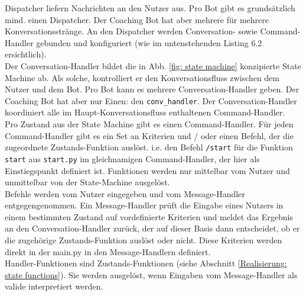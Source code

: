         Dispatcher liefern Nachrichten an den Nutzer aus. Pro Bot gibt es grundsätzlich mind. einen Dispatcher. Der Coaching Bot hat aber mehrere für mehrere Konversationsstränge. An den Dispatcher werden Conversation- sowie Command-Handler gebunden und konfiguriert (wie im untenstehenden Listing 6.2 ersichtlich).\\
        Der Conversation-Handler bildet die in Abb. \ref*{fig: state machine} konzipierte State Machine ab. Als solche, kontrolliert er den Konversationsfluss zwischen dem Nutzer und dem Bot. Pro Bot kann es mehrere Conversation-Handler geben. Der Coaching Bot hat aber nur Einen: den \verb|conv_handler|. Der Conversation-Handler koordiniert alle im Haupt-Konversationsfluss enthaltenen Command-Handler.\\
        Pro Zustand aus der State Machine gibt es einen Command-Handler. Für jeden Command-Handler gibt es ein Set an Kriterien und / oder einen Befehl, der die zugeordnete Zustands-Funktion auslöst. i.e. den Befehl \verb|/start| für die Funktion \verb|start| aus \verb|start.py| im gleichnamigen Command-Handler, der hier als Einstiegspunkt definiert ist. Funktionen werden nur mittelbar vom Nutzer und unmittelbar von der State-Machine ausgelöst.\\
        Befehle werden vom Nutzer eingegeben und vom Message-Handler entgegengenommen. Ein Message-Handler prüft die Eingabe eines Nutzers in einem bestimmten Zustand auf vordefinierte Kriterien und meldet das Ergebnis an den Conversation-Handler zurück, der auf dieser Basis dann entscheidet, ob er die zugehörige Zustands-Funktion auslöst oder nicht. Diese Kriterien werden direkt in der main.py in den Message-Handlern definiert. \\
        Handler-Funktionen sind Zustands-Funktionen (siehe Abschnitt \ref*{Realisierung: state functions}). Sie werden ausgelöst, wenn Eingaben vom Message-Handler als valide interpretiert werden. 

